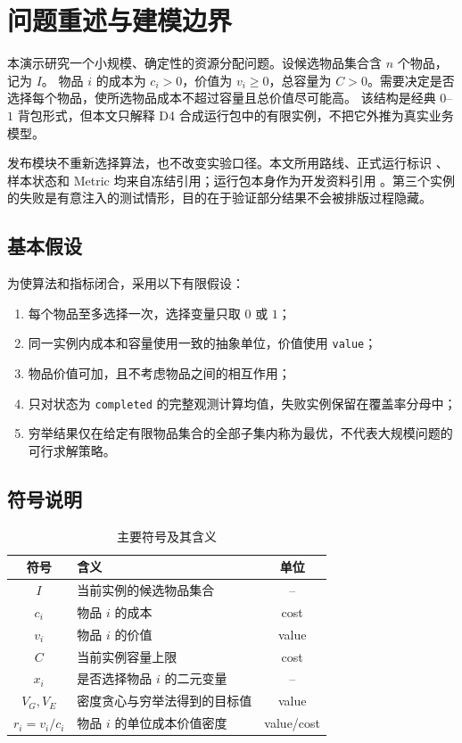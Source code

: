 \section{问题重述与建模边界}

本演示研究一个小规模、确定性的资源分配问题。设候选物品集合含 $n$ 个物品，记为 $I$。
物品 $i$ 的成本为 $c_i>0$，价值为 $v_i\geq 0$，总容量为
$C>0$。需要决定是否选择每个物品，使所选物品成本不超过容量且总价值尽可能高。
该结构是经典 $0$--$1$ 背包形式，但本文只解释 D4 合成运行包中的有限实例，不把它外推为真实业务模型。

发布模块不重新选择算法，也不改变实验口径。本文所用路线、正式运行标识
\texttt{\ExperimentRunId}、样本状态和 Metric 均来自冻结引用；运行包本身作为开发资料引用
\cite{D4SyntheticRun}。第三个实例的失败是有意注入的测试情形，目的在于验证部分结果不会被排版过程隐藏。

\subsection{基本假设}

为使算法和指标闭合，采用以下有限假设：
\begin{enumerate}
  \item 每个物品至多选择一次，选择变量只取 $0$ 或 $1$；
  \item 同一实例内成本和容量使用一致的抽象单位，价值使用 \texttt{value}；
  \item 物品价值可加，且不考虑物品之间的相互作用；
  \item 只对状态为 \texttt{completed} 的完整观测计算均值，失败实例保留在覆盖率分母中；
  \item 穷举结果仅在给定有限物品集合的全部子集内称为最优，不代表大规模问题的可行求解策略。
\end{enumerate}

\subsection{符号说明}

\begin{table}[H]
  \centering
  \caption{主要符号及其含义}
  \begin{tabularx}{\linewidth}{cYc}
    \toprule
    符号 & 含义 & 单位\\
    \midrule
    $I$ & 当前实例的候选物品集合 & --\\
    $c_i$ & 物品 $i$ 的成本 & cost\\
    $v_i$ & 物品 $i$ 的价值 & value\\
    $C$ & 当前实例容量上限 & cost\\
    $x_i$ & 是否选择物品 $i$ 的二元变量 & --\\
    $V_G,V_E$ & 密度贪心与穷举法得到的目标值 & value\\
    $r_i=v_i/c_i$ & 物品 $i$ 的单位成本价值密度 & value/cost\\
    \bottomrule
  \end{tabularx}
\end{table}
